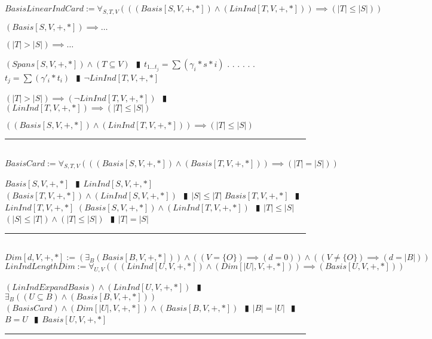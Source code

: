 \documentclass{book}
\newcommand{\abr}{:=}
\newcommand{\cont}{\phantom{.}. . .\phantom{.}}
\newcommand{\pipe}{$\phantom{(}\vrectangleblack\phantom{)}$}
\newcommand{\pr}[1]{\left(#1\right)}
\begin{document}
$BasisLinearIndCard \abr \forall_{S, T, V}\pr{\pr{(Basis[S, V, +, *]) \land (LinInd[T, V, +, *])} \implies (|T| \leq |S|)}$
\begin{enumerate}
  \lit $(Basis[S, V, +, *]) \implies \ldots$
  \begin{enumerate}
      \lit $(|T| > |S|) \implies \ldots$
      \begin{enumerate}
        \lit $(Spans[S, V, +, *]) \land (T \subseteq V)$ \pipe $t_{1 \ldots t_j} = \sum(\gamma_i * s*i)$ \cont
        \lit \cont $t_j = \sum(\gamma'_i * t_i)$ \pipe $\lnot LinInd[T, V, +, *]$
      \end{enumerate}
      \lit $(|T| > |S|) \implies (\lnot LinInd[T, V, +, *])$ \pipe $(LinInd[T, V, +, *]) \implies (|T| \leq |S|)$
   \end{enumerate}
  \lit $\pr{(Basis[S, V, +, *]) \land (LinInd[T, V, +, *])} \implies (|T| \leq |S|)$
\end{enumerate} \vspace{.75mm} \hrule \vspace{.75mm} \ \\ 

$BasisCard \abr \forall_{S, T, V}\pr{\pr{(Basis[S, V, +, *]) \land (Basis[T, V, +, *])} \implies (|T| = |S|)}$
\begin{enumerate}
  \lit $Basis[S, V, +, *]$ \pipe $LinInd[S, V, +, *]$
  \lit $(Basis[T, V, +, *]) \land (LinInd[S, V, +, *])$ \pipe $|S| \leq |T|$
  \lit $Basis[T, V, +, *]$ \pipe $LinInd[T, V, +, *]$
  \lit $(Basis[S, V, +, *]) \land (LinInd[T, V, +, *])$ \pipe $|T| \leq |S|$
  \lit $(|S| \leq |T|) \land (|T| \leq |S|)$ \pipe $|T| = |S|$
\end{enumerate} \vspace{.75mm} \hrule \vspace{.75mm} \ \\ 

$Dim[d, V, +, *] \abr \pr{\exists_{B}(Basis[B, V, +, *])} \land \pr{(V = \{O\}) \implies (d = 0)} \land  \pr{(V \neq \{O\}) \implies (d = |B|)}$ \\

$LinIndLengthDim \abr \forall_{U, V}\pr{\pr{(LinInd[U, V, +, *]) \land (Dim[|U|, V, +, *])} \implies (Basis[U, V, +, *])}$
\begin{enumerate}
  \lit $(LinIndExpandBasis) \land (LinInd[U, V, +, *])$ \pipe $\exists_{B}\pr{(U \subseteq B) \land (Basis[B, V, +, *])}$
  \lit $(BasisCard) \land (Dim[|U|, V, +, *]) \land (Basis[B, V, +, *])$ \pipe $|B| = |U|$ \pipe $B = U$ \pipe $Basis[U, V, +, *]$
\end{enumerate} \vspace{.75mm} \hrule \vspace{.75mm} \ \\ 
\end{document}
